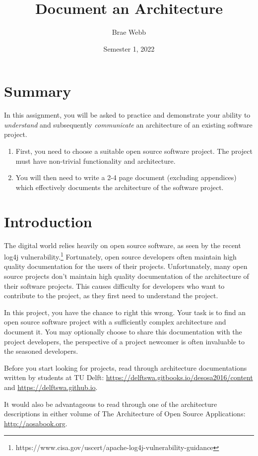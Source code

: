 \documentclass{csse4400}
\title{Document an Architecture}
\author{Brae Webb}
\date{Semester 1, 2022}
\begin{document}
\maketitle

\section*{Summary}
In this assignment, you will be asked to practice and demonstrate your ability to
\textsl{understand} and subsequently \textsl{communicate} an architecture of an existing software project.
\begin{enumerate}
\item First, you need to choose a suitable open source software project.
        The project must have non-trivial functionality and architecture.
\item You will then need to write a 2-4 page document (excluding appendices) which 
        effectively documents the architecture of the software project.
\end{enumerate}

\section{Introduction}
The digital world relies heavily on open source software, as seen by the recent log4j vulnerability.\footnote{https://www.cisa.gov/uscert/apache-log4j-vulnerability-guidance}
Fortunately, open source developers often maintain high quality documentation for the users of their projects.
Unfortunately, many open source projects don't maintain high quality documentation of the architecture of their software projects.
This causes difficulty for developers who want to contribute to the project, as they first need to understand the project.

In this project, you have the chance to right this wrong.
Your task is to find an open source software project with a sufficiently complex architecture and document it.
You may optionally choose to share this documentation with the project developers,
the perspective of a project newcomer is often invaluable to the seasoned developers.

Before you start looking for projects, read through architecture documentations written by students at TU Delft:
\url{https://delftswa.gitbooks.io/desosa2016/content} and \url{https://delftswa.github.io}.

It would also be advantageous to read through one of the architecture descriptions in either volume of
The Architecture of Open Source Applications: \url{http://aosabook.org}.
\end{document}
